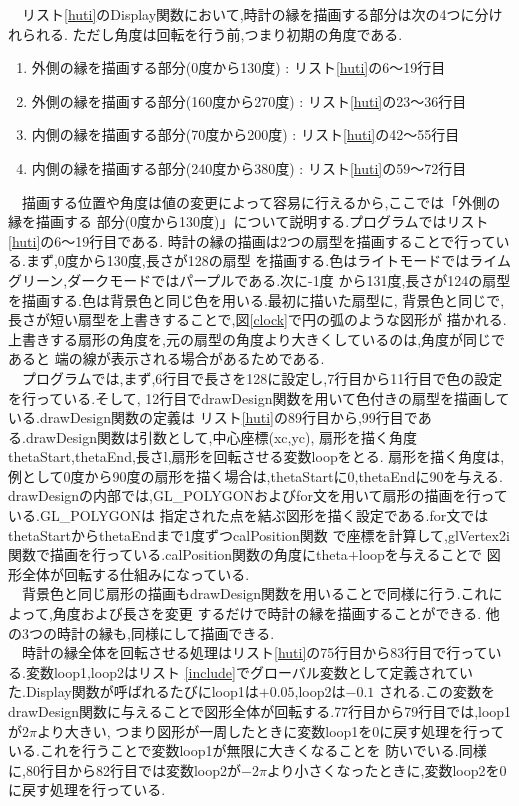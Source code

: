 \documentclass[a4j]{jarticle}
\begin{document}
    　リスト\ref{huti}のDisplay関数において,時計の縁を描画する部分は次の4つに分けれられる.
    ただし角度は回転を行う前,つまり初期の角度である.
    \begin{enumerate}
      \item 外側の縁を描画する部分(0度から130度) : リスト\ref{huti}の6～19行目
      \item 外側の縁を描画する部分(160度から270度) : リスト\ref{huti}の23～36行目
      \item 内側の縁を描画する部分(70度から200度) : リスト\ref{huti}の42～55行目
      \item 内側の縁を描画する部分(240度から380度) : リスト\ref{huti}の59～72行目
    \end{enumerate}
    　描画する位置や角度は値の変更によって容易に行えるから,ここでは「外側の縁を描画する
    部分(0度から130度)」について説明する.プログラムではリスト\ref{huti}の6～19行目である.
    時計の縁の描画は2つの扇型を描画することで行っている.まず,0度から130度,長さが128の扇型
    を描画する.色はライトモードではライムグリーン,ダークモードではパープルである.次に-1度
    から131度,長さが124の扇型を描画する.色は背景色と同じ色を用いる.最初に描いた扇型に,
    背景色と同じで,長さが短い扇型を上書きすることで,図\ref{clock}で円の弧のような図形が
    描かれる.上書きする扇形の角度を,元の扇型の角度より大きくしているのは,角度が同じであると
    端の線が表示される場合があるためである.\\
    　プログラムでは,まず,6行目で長さを128に設定し,7行目から11行目で色の設定を行っている.そして,
    12行目でdrawDesign関数を用いて色付きの扇型を描画している.drawDesign関数の定義は
    リスト\ref{huti}の89行目から,99行目である.drawDesign関数は引数として,中心座標(xc,yc),
    扇形を描く角度thetaStart,thetaEnd,長さl,扇形を回転させる変数loopをとる.
    扇形を描く角度は,例として0度から90度の扇形を描く場合は,thetaStartに0,thetaEndに90を与える.
    drawDesignの内部では,GL\_POLYGONおよびfor文を用いて扇形の描画を行っている.GL\_POLYGONは
    指定された点を結ぶ図形を描く設定である.for文ではthetaStartからthetaEndまで1度ずつcalPosition関数
    で座標を計算して,glVertex2i関数で描画を行っている.calPosition関数の角度にtheta$+$loopを与えることで
    図形全体が回転する仕組みになっている.\\
    　背景色と同じ扇形の描画もdrawDesign関数を用いることで同様に行う.これによって,角度および長さを変更
    するだけで時計の縁を描画することができる.
    他の3つの時計の縁も,同様にして描画できる.\\
    　時計の縁全体を回転させる処理はリスト\ref{huti}の75行目から83行目で行っている.変数loop1,loop2はリスト
    \ref{include}でグローバル変数として定義されていた.Display関数が呼ばれるたびにloop1は$+0.05$,loop2は$-0.1$
    される.この変数をdrawDesign関数に与えることで図形全体が回転する.77行目から79行目では,loop1が$2\pi$より大きい,
    つまり図形が一周したときに変数loop1を0に戻す処理を行っている.これを行うことで変数loop1が無限に大きくなることを
    防いでいる.同様に,80行目から82行目では変数loop2が$-2\pi$より小さくなったときに,変数loop2を0に戻す処理を行っている.
\end{document}
